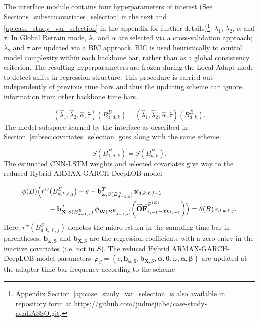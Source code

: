 \documentclass[10pt,a4paper,oneside]{article}
\begin{document}
The interface module contains four hyperparameters of interest (See Sections~\ref{subsec:covariates_selection} in the text and \ref{ap:case_study_var_selection} in the appendix for further details)\footnote{Appendix Section~\ref{ap:case_study_var_selection} is also available in repository form at \url{https://github.com/judmejiabe/case-study-adaLASSO.git}.}: $\lambda_1$, $\lambda_2$, $\alpha$ and $\tau$. In Global Retrain mode, \(\lambda_1\) and \(\alpha\) are selected via a cross-validation approach; \(\lambda_2\) and \(\tau\) are updated via a BIC approach. BIC is used heuristically to control model complexity within each backbone bar, rather than as a global consistency criterion. The resulting hyperparameters are frozen during the Local Adapt mode to detect shifts in regression structure. This procedure is carried out independently of previous time bars and thus the updating scheme can ignore information from other backbone time bars.

$$
(\hat{\lambda}_1, \hat{\lambda}_2, \hat{\alpha}, \hat{\tau})(B^{B}_{1:d, k}) = (\hat{\lambda}_1, \hat{\lambda}_2, \hat{\alpha}, \hat{\tau})(B^{B}_{d, k}).
$$
The model subspace learned by the interface as described in Section~\ref{subsec:covariates_selection} goes along with the same scheme

$$
S(B^B_{1:d, k}) = S(B^B_{d, k}).
$$
The estimated CNN-LSTM weights and selected covariates give way to the reduced Hybrid ARMAX-GARCH-DeepLOB model

\begin{align*}
\phi(B)\Bigl(&r^w\bigl(B^{S}_{d,k,\ell,j}\bigr) - c 
    - \mathbf{b}_{\boldsymbol{\omega}, S(B^B_{d-1,k})}^{T}\,\mathbf{x}_{d,k,\ell,j-1} \notag\\
    &\quad - \mathbf{b}^T_{\mathbf{X}, S(B^B_{d-1,k})}\,
      \phi_{\hat{\mathbf{W}}(B^B_{1:d-1,k})}\!\left(\widetilde{\mathbf{OF}}^{\mathcal{P}^{(E)}}_{i_{j-1}-99:i_{j-1}}\right)
\Bigr) = \theta(B)\,\varepsilon_{d,k,\ell,j}.
\end{align*}
Here, $r^w(B^{S}_{d,k,\ell,j})$ denotes the micro-return in the sampling time bar in parentheses, $\mathbf{b}_{\boldsymbol{\omega, S}}$ and $\mathbf{b}_{\mathbf{X}, S}$ are the regression coefficients with a zero entry in the inactive covariates (i.e. not in $S$). The reduced Hybrid ARMAX-GARCH-DeepLOB model parameters $\boldsymbol{\varphi}_{S} = (c, \mathbf{b}_{\boldsymbol{\omega, S}}, \mathbf{b}_{\mathbf{X}, S}, \boldsymbol{\phi}, \boldsymbol{\theta}, \omega, \boldsymbol{\alpha}, \boldsymbol{\beta})$ are updated at the adapter time bar frequency according to the scheme
\end{document}
